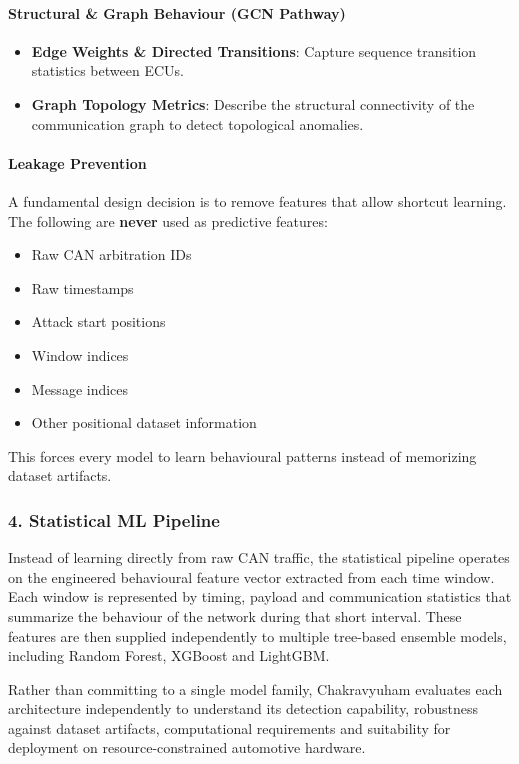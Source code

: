 \documentclass{article}
\begin{document}
\paragraph{Structural \& Graph Behaviour (GCN Pathway)}
\begin{itemize}[noitemsep]
    \item \textbf{Edge Weights \& Directed Transitions}: Capture sequence transition statistics between ECUs.
    \item \textbf{Graph Topology Metrics}: Describe the structural connectivity of the communication graph to detect topological anomalies.
\end{itemize}

\paragraph{Leakage Prevention}
A fundamental design decision is to remove features that allow shortcut learning.
The following are \textbf{never} used as predictive features:
\begin{itemize}[noitemsep]
    \item Raw CAN arbitration IDs
    \item Raw timestamps
    \item Attack start positions
    \item Window indices
    \item Message indices
    \item Other positional dataset information
\end{itemize}
This forces every model to learn behavioural patterns instead of memorizing dataset artifacts.

\subsubsection{4. Statistical ML Pipeline}
Instead of learning directly from raw CAN traffic, the statistical pipeline operates on the engineered behavioural feature vector extracted from each time window. Each window is represented by timing, payload and communication statistics that summarize the behaviour of the network during that short interval. These features are then supplied independently to multiple tree-based ensemble models, including Random Forest, XGBoost and LightGBM.

Rather than committing to a single model family, Chakravyuham evaluates each architecture independently to understand its detection capability, robustness against dataset artifacts, computational requirements and suitability for deployment on resource-constrained automotive hardware.
\end{document}
